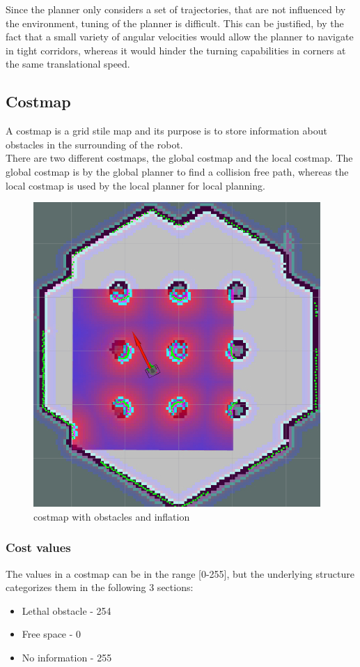 Since the planner only considers a set of trajectories, that are not influenced by the environment, tuning of the planner is difficult. 
This can be justified, by the fact that a small variety of angular velocities would allow the planner to navigate in tight corridors, whereas it would hinder the turning capabilities in corners at the same translational speed.

\subsection{Costmap}
A costmap is a grid stile map and its purpose is to store information about obstacles in the surrounding of the robot.\\
There are two different costmaps, the global costmap and the local costmap.
The global costmap is by the global planner to find a collision free path, whereas the local costmap is used by the local planner for local planning.\cite{navsetup}\\

\begin{figure}[H]
\centering
	\includegraphics[width=.5\textwidth]{Pictures/inflationref}
	\caption{costmap with obstacles and inflation \cite{infl}}
	\label{costmap}
\end{figure}


\subsubsection{Cost values}
The values in a costmap can be in the range [0-255], but the underlying structure categorizes them in the following 3 sections:
\begin{itemize}
	\item Lethal obstacle - 254
	\item Free space - 0
	\item No information - 255
\end{itemize}


